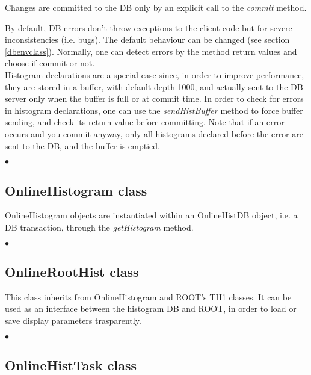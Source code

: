 \documentclass{lhcbnote}
\begin{document}
Changes are committed to the DB only by an explicit call to the {\it
commit} method.

By default, DB errors don't throw exceptions to the client code but
for severe inconsistencies (i.e. bugs). The default behaviour can be
changed (see section \ref{dbenvclass}). Normally, one can detect
errors by the method return values and choose if commit or not. \\
Histogram declarations are a special case since, 
in order to improve performance, they are stored in
a buffer, with default depth 1000, and actually sent to the DB
server only when the buffer is full or at commit time. In order to
check for errors in histogram declarations, one can use the {\it
sendHistBuffer} method to force buffer sending, and check its return
value before committing. Note that if an error occurs and you commit anyway, 
only all histograms declared before the error are sent to the DB, and
the buffer is emptied.


\begin{list}{$\bullet$}{}



\end{list}


\subsection{OnlineHistogram class}

OnlineHistogram objects are instantiated within an
OnlineHistDB object, i.e. a DB transaction, through the {\it
getHistogram} method.

\begin{list}{$\bullet$}{}

\end{list}

\subsection{OnlineRootHist class}

This class inherits from OnlineHistogram and ROOT's TH1 classes. It
can be used as an interface between the histogram DB and ROOT, in
order to load or save display parameters trasparently.

\begin{list}{$\bullet$}{}

\end{list}


\subsection{OnlineHistTask class}
\end{document}
